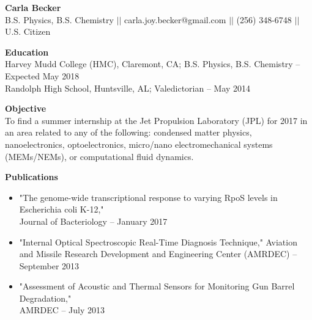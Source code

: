\documentclass[9pt]{article}
\begin{document}
{\centering \Large \bf Carla Becker \\}
{\centering B.S. Physics, B.S. Chemistry $\vert \vert$ carla.joy.becker@gmail.com $\vert \vert$ (256) 348-6748 $\vert \vert$ U.S. Citizen\\}

\noindent
{\bf Education \\}
Harvey Mudd College (HMC), Claremont, CA; B.S. Physics, B.S. Chemistry \--- Expected May 2018 \\
Randolph High School, Huntsville, AL; Valedictorian \--- May 2014 
\vspace{3mm}

\linespread{1}


\noindent
{\bf Objective \\}
To find a summer internship at the Jet Propulsion Laboratory (JPL) for 2017 in an area related to any of the following: condensed matter physics, nanoelectronics, optoelectronics, micro/nano electromechanical systems (MEMs/NEMs), or computational fluid dynamics.
\vspace{3mm}

\noindent
{\bf Publications \\}
\vspace{-8mm}
\begin{itemize}[leftmargin=3.75mm]
	\setlength{\itemsep}{0pt}
    \setlength{\parskip}{0pt}
    \setlength{\parsep}{0pt}
\item "The genome-wide transcriptional response to varying RpoS levels in Escherichia coli K-12," \\ Journal of Bacteriology \--- January 2017
\item "Internal Optical Spectroscopic Real-Time Diagnosis Technique,"  Aviation and Missile Research Development and Engineering Center (AMRDEC) \--- September 2013
\item "Assessment of Acoustic and Thermal Sensors for Monitoring Gun Barrel Degradation," \\ AMRDEC \--- July 2013
\end{itemize}
\end{document}
